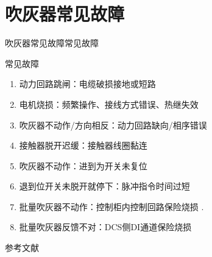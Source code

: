 \documentclass[12pt,hyperref={CJKbookmarks=true}]{beamer} %
\begin{document}
\section{吹灰器常见故障}

\begin{frame}{吹灰器常见故障}{常见故障}
		\begin{block}{常见故障}
			\begin{enumerate}
				\item  动力回路跳闸：电缆破损接地或短路
				
				\item  电机烧损：频繁操作、接线方式错误、热继失效
				
				\item   吹灰器不动作/方向相反：动力回路缺向/相序错误
\item   接触器脱开迟缓：接触器线圈黏连
				\item  吹灰器不动作：进到为开关未复位
				\item  退到位开关未脱开就停下：脉冲指令时间过短
\item  批量吹灰器不动作：控制柜内控制回路保险烧损
.\item  批量吹灰器反馈不对：DCS侧DI通道保险烧损
			\end{enumerate}
		\end{block}

	\end{frame}



	
	

	
\begin{frame}{参考文献}
\begin{thebibliography}{10}
	
\end{thebibliography}
\end{frame}
\end{document}
